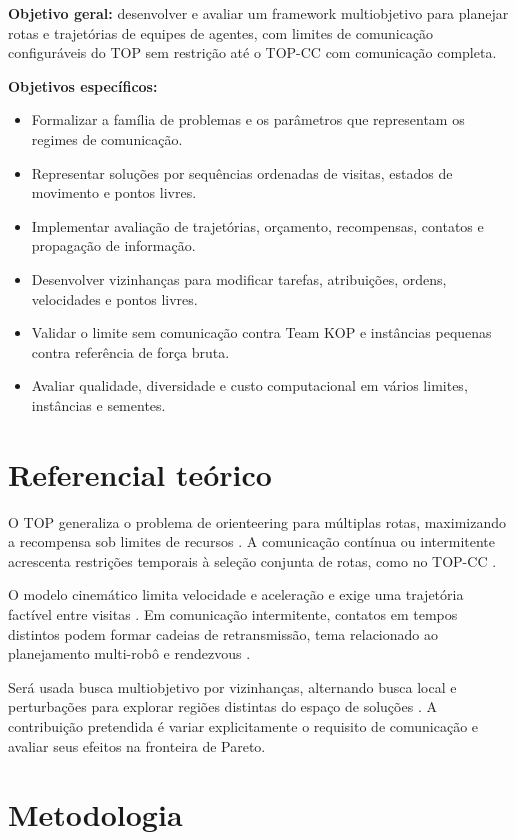 \documentclass[mscproposta,portugues]{ppgccufmg}
\begin{document}
\textbf{Objetivo geral:} desenvolver e avaliar um framework multiobjetivo para planejar rotas e trajetórias de equipes de agentes, com limites de comunicação configuráveis do TOP sem restrição até o TOP-CC com comunicação completa.

\textbf{Objetivos específicos:}
\begin{itemize}
    \item Formalizar a família de problemas e os parâmetros que representam os regimes de comunicação.
    \item Representar soluções por sequências ordenadas de visitas, estados de movimento e pontos livres.
    \item Implementar avaliação de trajetórias, orçamento, recompensas, contatos e propagação de informação.
    \item Desenvolver vizinhanças para modificar tarefas, atribuições, ordens, velocidades e pontos livres.
    \item Validar o limite sem comunicação contra Team KOP e instâncias pequenas contra referência de força bruta.
    \item Avaliar qualidade, diversidade e custo computacional em vários limites, instâncias e sementes.
\end{itemize}

\section{Referencial teórico}

O TOP generaliza o problema de orienteering para múltiplas rotas, maximizando a recompensa sob limites de recursos \citep{chao1996team}. A comunicação contínua ou intermitente acrescenta restrições temporais à seleção conjunta de rotas, como no TOP-CC \citep{gunawan2016survey,topcc}.

O modelo cinemático limita velocidade e aceleração e exige uma trajetória factível entre visitas \citep{meyer2022kop}. Em comunicação intermitente, contatos em tempos distintos podem formar cadeias de retransmissão, tema relacionado ao planejamento multi-robô e rendezvous \citep{kantaros2016intermittent,kantaros2017temporal}.

Será usada busca multiobjetivo por vizinhanças, alternando busca local e perturbações para explorar regiões distintas do espaço de soluções \citep{hansen2017vns}. A contribuição pretendida é variar explicitamente o requisito de comunicação e avaliar seus efeitos na fronteira de Pareto.

\section{Metodologia}
\end{document}
